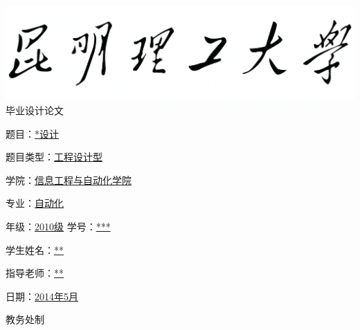 \documentclass[12pt,a4paper]{article}
\begin{document}
\begin{titlepage}
{
\begin{center}
{
\includegraphics[scale=0.18]{1.png}\\
}
\vspace{10pt}
{
\hei
\fontsize{44pt}{55pt}\selectfont
毕\thickspace 业\thickspace 设\thickspace 计\thickspace 论\thickspace 文
\\[50mm]
}
\end{center}
}

{
\songti

\fontsize{15pt}{18pt}\selectfont
{}\baselineskip
 题\qquad 目：\uline{\hfill **设计\hfill}\hspace{15mm} \par
 题目类型：\uline{\hfill 工程设计型\hfill}\hspace{15mm} \par
 学\qquad 院：\uline{\hfill 信息工程与自动化学院\hfill}\hspace{15mm} \par
 专\qquad 业：\uline{\hfill 自动化\hfill}\hspace{15mm} \par
 年\qquad 级：\uline{\hfill 2010级\hfill} 学\quad 号：\uline{\hfill ****\hfill}\hspace{15mm} \par
 学生姓名：\uline{\hfill *** \hfill}\hspace{15mm} \par
 指导老师：\uline{\hfill *** \hfill}\hspace{15mm} \par
 日\qquad 期：\uline{\hfill 2014年5月\hfill}\hspace{15mm} \par
}
 \vspace{13mm}
{

\songti
\begin{center}
\fontsize{15pt}{18pt}\selectfont
教\quad 务\quad 处\quad 制
\end{center}
}
\end{titlepage}
\end{document}
